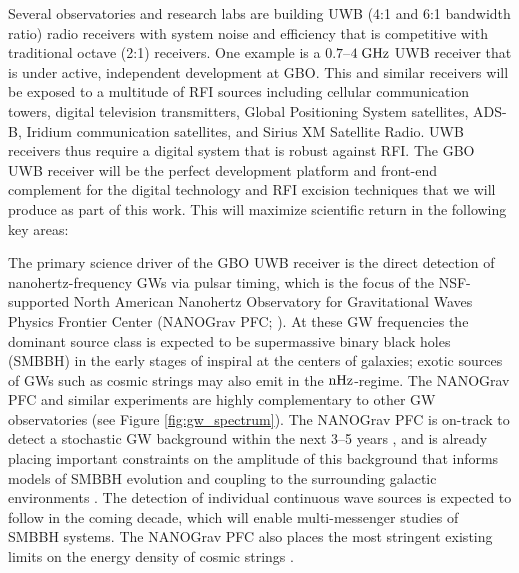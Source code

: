 \documentclass[10pt]{myNSF}
\begin{document}
\label{sec:uwbr}

Several observatories and research labs are building UWB (4:1 and 6:1
bandwidth ratio) radio receivers with system noise and efficiency that
is competitive with traditional octave (2:1) receivers.  One example
is a $0.7$--$4\; \textrm{GHz}$ UWB receiver that is under active, independent
development at GBO.  This and similar receivers will be exposed to a
multitude of RFI sources including cellular communication towers,
digital television transmitters, Global Positioning System satellites,
ADS-B, Iridium communication satellites, and Sirius XM Satellite
Radio.  UWB receivers thus require a digital system that is robust
against RFI.  The GBO UWB receiver will be the perfect development
platform and front-end complement for the digital technology and RFI
excision techniques that we will produce as part of this work.  This
will maximize scientific return in the following key areas:

 The
primary science driver of the GBO UWB receiver is the direct detection
of nanohertz-frequency GWs via pulsar timing, which is the focus of
the NSF-supported North American Nanohertz Observatory for
Gravitational Waves Physics Frontier Center (NANOGrav PFC;
\cite{mcl13}).  At these GW frequencies the dominant source class is
expected to be supermassive binary black holes (SMBBH) in the early
stages of inspiral at the centers of galaxies; exotic sources of GWs
such as cosmic strings may also emit in the $\textrm{nHz}$-regime.  The
NANOGrav PFC and similar experiments are highly complementary to other
GW observatories (see Figure \ref{fig:gw_spectrum}).  The NANOGrav PFC
is on-track to detect a stochastic GW background within the next 3--5
years \citep{tve+15}, and is already placing important constraints on
the amplitude of this background that informs models of SMBBH
evolution and coupling to the surrounding galactic environments
\citep{abb+16,abb+18}.  The detection of individual continuous wave
sources is expected to follow in the coming decade, which will enable
multi-messenger studies of SMBBH systems.  The NANOGrav PFC also
places the most stringent existing limits on the energy density of
cosmic strings \citep{abb+18}.
\end{document}
